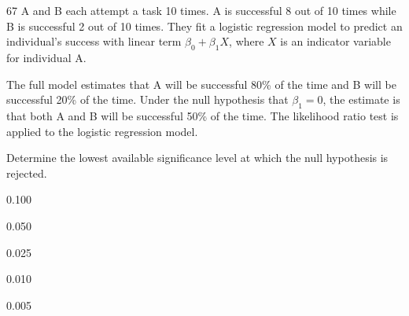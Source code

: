 \begin{question}{67}
A and B each attempt a task 10 times. A is successful 8 out of 10 times while B is successful 2 out of 10 times. They fit a logistic regression model to predict an individual's success with linear term $\beta_0 + \beta_1 X$, where $X$ is an indicator variable for individual A.

The full model estimates that A will be successful 80\% of the time and B will be successful 20\% of the time. Under the null hypothesis that $\beta_1 = 0$, the estimate is that both A and B will be successful 50\% of the time. The likelihood ratio test is applied to the logistic regression model.

Determine the lowest available significance level at which the null hypothesis is rejected.

\begin{choices}
\item 0.100
\item 0.050
\item 0.025
\item 0.010
\item 0.005
\end{choices}
\end{question}

